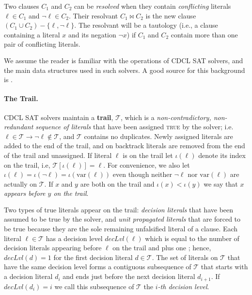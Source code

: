 \documentclass[runningheads]{llncs}
\newcommand{\sat}{SAT\xspace}
\newcommand{\trail}{\ensuremath{\mathcal{T}}}
\newcommand{\trailIdx}[1]{\ensuremath{\iota(#1)}}
\newcommand{\dlevel}[1]{\ensuremath{\mathit{decLvl}(#1)}}
\newcommand{\var}{\text{var}}
\newcommand{\true}{\textsc{true}\xspace}
\newcommand{\resolve}{\bowtie}
\renewcommand{\implies}{\rightarrow}
\newcommand{\nf}[1]{{\color{red}{#1}}}
\begin{document}
Two clauses $C_1$ and $C_2$ can be \emph{resolved} when they contain
\emph{conflicting} literals $\ell\in C_1$ and $\lnot \ell \in
C_2$. Their resolvant $C_1 \resolve C_2$ is the new clause
$(C_1 \cup C_2) - \{\ell, \lnot \ell\}$. The resolvant will be a
tautology (i.e., a clause containing a literal $x$ and its negation
$\lnot x$) if $C_1$ and $C_2$ contain more than one pair of
conflicting literals.

We assume the reader is familiar with the operations of CDCL \sat
solvers, and the main data structures used in such solvers. A good
source for this background is \cite{DBLP:series/faia/SilvaLM09}.

\paragraph{The Trail.}
CDCL \sat solvers maintain a \textbf{trail}, $\trail$, which is a
\textit{non-contradictory, non-redundant sequence of literals} that
have been assigned \true by the solver; i.e.
$\ell\in\trail \implies \lnot\ell \not\in\trail$, and $\trail$
contains no duplicates. Newly assigned literals are added to the end
of the trail, and on backtrack literals are removed from the end of
the trail and unassigned.  If literal $\ell$ is on the trail let
$\trailIdx{\ell}$ denote its index on the trail, i.e,
$\trail[\trailIdx{\ell}] = \ell$. For convenience, we also let
$\trailIdx{\ell} = \trailIdx{\lnot \ell} = \trailIdx{\var(\ell)}$ even
though neither $\lnot \ell$ nor $\var(\ell)$ are actually on
$\trail$. If $x$ and $y$ are both on the trail and
$\trailIdx{x} < \trailIdx{y}$ we say that \textit{$x$ appears before
  $y$ on the trail}. 

Two types of true literals appear on the trail: \emph{decision
  literals} that have been assumed to be true by the solver, and
\emph{unit propagated literals} that are forced to be true because
they are the sole remaining unfalsified literal of a clause. Each
literal $\ell\in\trail$ has a decision level $\dlevel{\ell}$ which is
equal to the number of decision literals appearing before $\ell$ on
the trail and plus one \nf{if $\ell$ is a decision literal}; hence, $\dlevel{d}=1$ for the first decision
literal $d\in\trail$.  The set of literals on $\trail$ that have the
same decision level forms a contiguous subsequence of $\trail$ that
starts with a decision literal $d_i$ and ends just before the next
decision literal $d_{i+1}$. If $\dlevel{d_i} = i$ we call this
subsequence of $\trail$ the \textit{$i$-th decision level}.
\end{document}
